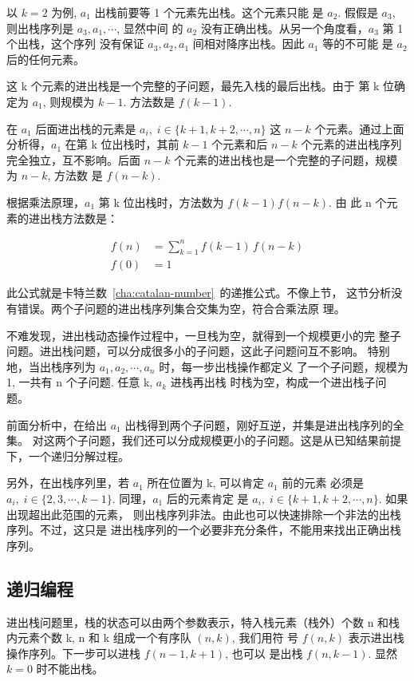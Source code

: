 以 $k = 2$ 为例, $a_1$ 出栈前要等 1 个元素先出栈。这个元素只能
是 $a_2$. 假假是 $a_3$, 则出栈序列是 $a_3,a_1,\cdots$, 显然中间
的 $a_2$ 没有正确出栈。从另一个角度看，$a_3$ 第 1 个出栈，这个序列
没有保证 $a_3,a_2,a_1$ 间相对降序出栈。因此 $a_1$ 等的不可能
是 $a_2$ 后的任何元素。

这 k 个元素的进出栈是一个完整的子问题，最先入栈的最后出栈。由于
第 k 位确定为 $a_1$, 则规模为 $k - 1$. 方法数是 $f(k - 1)$.

在 $a_1$ 后面进出栈的元素是 $a_i,\; i \in \{k+1,k+2,\cdots,n\}$ 这
$n - k$ 个元素。通过上面分析得，$a_1$ 在第 k 位出栈时，其前 $k -
1$ 个元素和后 $n - k$ 个元素的进出栈序列完全独立，互不影响。后面
$n - k$ 个元素的进出栈也是一个完整的子问题，规模为 $n - k$, 方法数
是 $f(n - k)$.

根据乘法原理，$a_1$ 第 k 位出栈时，方法数为 $f(k - 1)f(n - k)$. 由
此 n 个元素的进出栈方法数是：

\begin{align*}
  f(n) &= \sum_{k=1}^n f(k - 1)\,f(n - k) \\
  f(0) &= 1
\end{align*}

此公式就是卡特兰数~\ref{cha:catalan-number}~的递推公式。不像上节，
这节分析没有错误。两个子问题的进出栈序列集合交集为空，符合合乘法原
理。

不难发现，进出栈动态操作过程中，一旦栈为空，就得到一个规模更小的完
整子问题。进出栈问题，可以分成很多小的子问题，这此子问题问互不影响。
特别地，当出栈序列为 $a_1,a_2,\cdots,a_n$ 时，每一步出栈操作都定义
了一个子问题，规模为 1, 一共有 n 个子问题. 任意 k, $a_k$ 进栈再出栈
时栈为空，构成一个进出栈子问题。

前面分析中，在给出 $a_1$ 出栈得到两个子问题，刚好互逆，并集是进出栈序列的全集。
对这两个子问题，我们还可以分成规模更小的子问题。这是从已知结果前提
下，一个递归分解过程。

另外，在出栈序列里，若 $a_1$ 所在位置为 k, 可以肯定 $a_1$ 前的元素
必须是 $a_i,\; i \in \{2,3,\cdots,k-1\}$. 同理，$a_1$ 后的元素肯定
是 $a_i,\; i \in \{k+1,k+2,\cdots,n\}$. 如果出现超出此范围的元素，
则出栈序列非法。由此也可以快速排除一个非法的出栈序列。不过，这只是
进出栈序列的一个必要非充分条件，不能用来找出正确出栈序列。

\subsection{递归编程}

进出栈问题里，栈的状态可以由两个参数表示，特入栈元素（栈外）个数 n
和栈内元素个数 k, n 和 k 组成一个有序队 $(n,k)$, 我们用符
号 $f(n,k)$ 表示进出栈操作序列。下一步可以进栈 $f(n-1,k+1)$, 也可以
是出栈 $f(n,k-1)$. 显然 $k = 0$ 时不能出栈。

